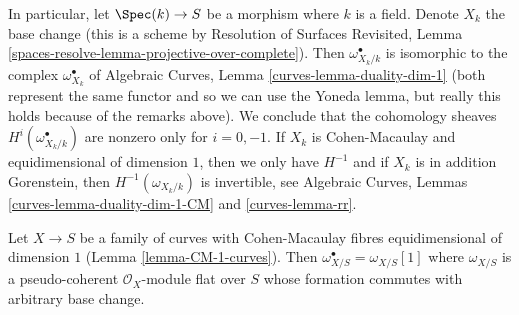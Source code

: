\medskip\noindent
In particular, let $\Spec(k) \to S$ be a morphism where $k$ is a field.
Denote $X_k$ the base change (this is a scheme by
Resolution of Surfaces Revisited, Lemma
\ref{spaces-resolve-lemma-projective-over-complete}).
Then $\omega_{X_k/k}^\bullet$ is isomorphic
to the complex $\omega_{X_k}^\bullet$ of
Algebraic Curves, Lemma \ref{curves-lemma-duality-dim-1}
(both represent the same functor and so we can use the Yoneda lemma,
but really this holds because of the remarks above).
We conclude that the cohomology sheaves
$H^i(\omega_{X_k/k}^\bullet)$
are nonzero only for $i = 0, -1$.
If $X_k$ is Cohen-Macaulay and equidimensional of dimension $1$,
then we only have $H^{-1}$ and if $X_k$ is in addition Gorenstein,
then $H^{-1}(\omega_{X_k/k})$ is invertible, see
Algebraic Curves, Lemmas \ref{curves-lemma-duality-dim-1-CM}
and \ref{curves-lemma-rr}.

\begin{lemma}
\label{lemma-CM-dualizing}
Let $X \to S$ be a family of curves with Cohen-Macaulay fibres
equidimensional of dimension $1$ (Lemma \ref{lemma-CM-1-curves}).
Then $\omega_{X/S}^\bullet = \omega_{X/S}[1]$ where $\omega_{X/S}$
is a pseudo-coherent $\mathcal{O}_X$-module flat over $S$ whose
formation commutes with arbitrary base change.
\end{lemma}

